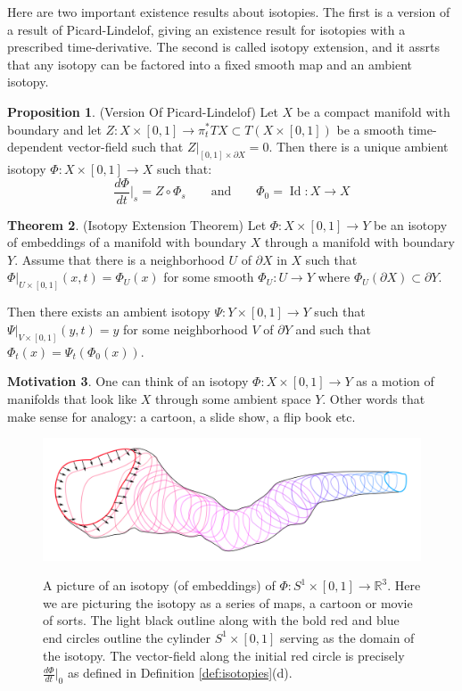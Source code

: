 \documentclass[12pt]{article}
\theoremstyle{definition}
\newtheorem{theorem}{Theorem}[section]
\newtheorem{proposition}[theorem]{Proposition}
\newtheorem{motivation}[theorem]{Motivation}
\numberwithin{equation}{section}
\newcommand{\R}{{\mathbb R}}
\newcommand{\op}{\operatorname}
\begin{document}
Here are two important existence results about isotopies. The first is a version of a result of Picard-Lindelof, giving an existence result for isotopies with a prescribed time-derivative. The second is called isotopy extension, and it assrts that any isotopy can be factored into a fixed smooth map and an ambient isotopy.

\begin{proposition} \label{prop:picard_lindelof} (Version Of Picard-Lindelof) Let $X$ be a compact manifold with boundary and let $Z:X \times [0,1] \to \pi^*_tTX \subset T(X \times [0,1])$ be a smooth time-dependent vector-field such that $Z|_{[0,1] \times \partial X} = 0$. Then there is a unique ambient isotopy $\Phi:X \times [0,1] \to X$ such that:
\[
\frac{d\Phi}{dt}|_s = Z \circ \Phi_s \qquad \text{and} \qquad \Phi_0 = \op{Id}:X \to X
\]
\end{proposition}

\begin{theorem} (Isotopy Extension Theorem) Let $\Phi:X \times [0,1] \to Y$ be an isotopy of embeddings of a manifold with boundary $X$ through a manifold with boundary $Y$. Assume that there is a neighborhood $U$ of $\partial X$ in $X$ such that $\Phi|_{U \times [0,1]}(x,t) = \Phi_U(x)$ for some smooth $\Phi_U:U \to Y$ where $\Phi_U(\partial X) \subset \partial Y$. 

Then there exists an ambient isotopy $\Psi:Y \times [0,1] \to Y$ such that $\Psi|_{V \times [0,1]}(y,t) = y$ for some neighborhood $V$ of $\partial Y$ and such that $\Phi_t(x) = \Psi_t(\Phi_0(x))$.
\end{theorem}

\begin{motivation} One can think of an isotopy $\Phi:X \times [0,1] \to Y$ as a motion of manifolds that look like $X$ through some ambient space $Y$. Other words that make sense for analogy: a cartoon, a slide show, a flip book etc. 
\end{motivation}

\begin{figure}[h]
    \centering
    \includegraphics[width=1\textwidth]{reu_figures/isotopy.png}
    \label{fig:isotopy}
    \caption{A picture of an isotopy (of embeddings) of $\Phi:S^1 \times [0,1] \to \R^3$. Here we are picturing the isotopy as a series of maps, a cartoon or movie of sorts. The light black outline along with the bold red and blue end circles outline the cylinder $S^1 \times [0,1]$ serving as the domain of the isotopy. The vector-field along the initial red circle is precisely $\frac{d\Phi}{dt}|_0$ as defined in Definition \ref{def:isotopies}(d).}
\end{figure}
\end{document}
